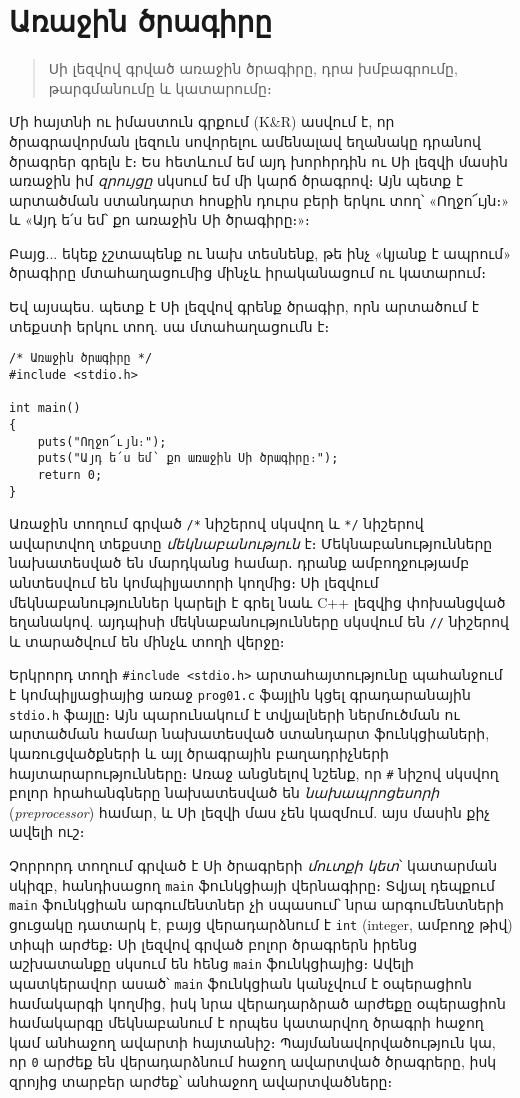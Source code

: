 \chapter{Առաջին ծրագիրը}

\begin{quote}
Սի լեզվով գրված առաջին ծրագիրը, դրա խմբագրումը, թարգմանումը և կատարումը։
\end{quote}

Մի հայտնի ու իմաստուն գրքում (K\&R) ասվում է, որ ծրագրավորման լեզուն սովորելու ամենալավ եղանակը դրանով ծրագրեր գրելն է։ Ես հետևում եմ այդ խորհրդին ու Սի լեզվի մասին առաջին իմ \emph{զրույցը} սկսում եմ մի կարճ ծրագրով։ Այն պետք է արտածման ստանդարտ հոսքին դուրս բերի երկու տող՝ «Ողջո՜ւյն։» և «Այդ ե՛ս եմ՝ քո առաջին Սի ծրագիրը։»։

Բայց... եկեք չշտապենք ու նախ տեսնենք, թե ինչ «կյանք է ապրում» ծրագիրը մտահաղացումից մինչև իրականացում ու կատարում։

Եվ այսպես. պետք է Սի լեզվով գրենք ծրագիր, որն արտածում է տեքստի երկու տող. սա մտահաղացումն է։

\begin{verbatim}
/* Առաջին ծրագիրը */
#include <stdio.h>

int main()
{
    puts("Ողջո՜ւյն։");
    puts("Այդ ե՛ս եմ՝ քո առաջին Սի ծրագիրը։");
    return 0;
}
\end{verbatim}

Առաջին տողում գրված \verb|/*| նիշերով սկսվող և \verb|*/| նիշերով ավարտվող տեքստը \emph{մեկնաբանություն} է։ Մեկնաբանությունները նախատեսված են մարդկանց համար․ դրանք ամբողջությամբ անտեսվում են կոմպիլյատորի կողմից։ Սի լեզվում մեկնաբանություններ կարելի է գրել նաև C++ լեզվից փոխանցված եղանակով. այդպիսի մեկնաբանությունները սկսվում են \verb|//| նիշերով և տարածվում են մինչև տողի վերջը։

Երկրորդ տողի \verb|#include <stdio.h>| արտահայտությունը պահանջում է կոմպիլյացիայից առաջ \texttt{prog01.c} ֆայլին կցել գրադարանային \texttt{stdio.h} ֆայլը։ Այն պարունակում է տվյալների ներմուծման ու արտածման համար նախատեսված ստանդարտ ֆունկցիաների, կառուցվածքների և այլ ծրագրային բաղադրիչների հայտարարությունները։ Առաջ անցնելով նշենք, որ \verb|#| նիշով սկսվող բոլոր հրահանգները նախատեսված են \emph{նախապրոցեսորի} (\emph{preprocessor}) համար, և Սի լեզվի մաս չեն կազմում. այս մասին քիչ ավելի ուշ։

Չորրորդ տողում գրված է Սի ծրագրերի \emph{մուտքի կետ}՝ կատարման սկիզբ, հանդիսացող \texttt{main} ֆունկցիայի վերնագիրը։ Տվյալ դեպքում \texttt{main} ֆունկցիան արգումենտներ չի սպասում՝ նրա արգումենտների ցուցակը դատարկ է, բայց վերադարձնում է \texttt{int} (integer, ամբողջ թիվ) տիպի արժեք։ Սի լեզվով գրված բոլոր ծրագրերն իրենց աշխատանքը սկսում են հենց \texttt{main} ֆունկցիայից։ Ավելի պատկերավոր ասած՝ \texttt{main} ֆունկցիան կանչվում է օպերացիոն համակարգի կողմից, իսկ նրա վերադարձրած արժեքը օպերացիոն համակարգը մեկնաբանում է որպես կատարվող ծրագրի հաջող կամ անհաջող ավարտի հայտանիշ։ Պայմանավորվածություն կա, որ \texttt{0} արժեք են վերադարձնում հաջող ավարտված ծրագրերը, իսկ զրոյից տարբեր արժեք՝ անհաջող ավարտվածները։

